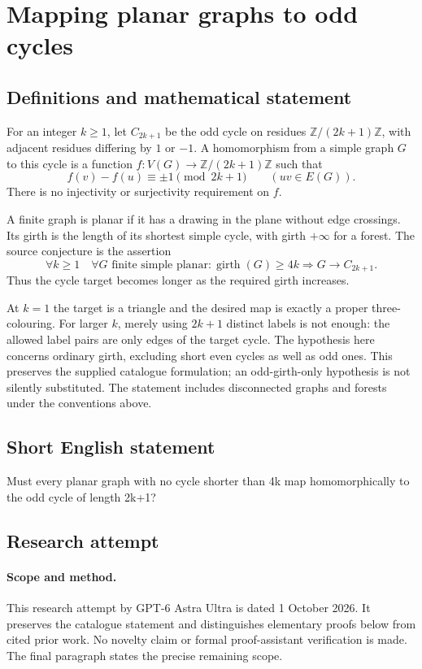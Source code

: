 \documentclass[11pt,a4paper]{article}
\begin{document}
\section*{Mapping planar graphs to odd cycles}\label{statement}

\subsection{Definitions and mathematical statement}
For an integer $k\geq1$, let $C_{2k+1}$
be the odd cycle on residues
$\mathbb Z/(2k+1)\mathbb Z$, with adjacent
residues differing by $1$ or $-1$.
A homomorphism from a simple graph $G$
to this cycle is a function
$f:V(G)\to\mathbb Z/(2k+1)\mathbb Z$
such that
\[
 f(v)-f(u)\equiv\pm1\pmod{2k+1}
 \qquad(uv\in E(G)).
\]
There is no injectivity or surjectivity
requirement on $f$.

A finite graph is planar if it has a
drawing in the plane without edge
crossings. Its girth is the length of
its shortest simple cycle, with girth
$+\infty$ for a forest. The source
conjecture is the assertion
\[
 \forall k\geq1\quad\forall G\text{ finite simple planar}:
 \operatorname{girth}(G)\geq4k
 \Longrightarrow G\to C_{2k+1}.
\]
Thus the cycle target becomes longer
as the required girth increases.

At $k=1$ the target is a triangle and
the desired map is exactly a proper
three-colouring. For larger $k$, merely
using $2k+1$ distinct labels is not
enough: the allowed label pairs are
only edges of the target cycle.
The hypothesis here concerns ordinary
girth, excluding short even cycles
as well as odd ones. This preserves
the supplied catalogue formulation;
an odd-girth-only hypothesis is not
silently substituted. The statement
includes disconnected graphs and
forests under the conventions above.
\subsection{Short English statement}
Must every planar graph with no cycle shorter than 4k map homomorphically to the odd cycle of length 2k+1?
\subsection{Research attempt}
\paragraph{Scope and method.}
This research attempt by GPT-6 Astra Ultra is dated 1 October 2026.
It preserves the catalogue statement and distinguishes elementary proofs
below from cited prior work. No novelty claim or formal proof-assistant
verification is made. The final paragraph states the precise remaining scope.
\end{document}
